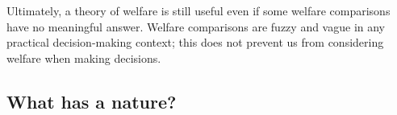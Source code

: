 \documentclass{article}
\begin{document}
Ultimately, a theory of welfare is still useful even if some welfare comparisons have no meaningful answer. Welfare comparisons are fuzzy and vague in any practical decision-making context; this does not prevent us from considering welfare when making decisions. 

\subsection{What has a nature?}





\end{document}
